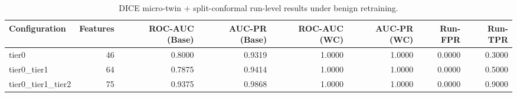 \begin{table}[t]
\centering
\caption{DICE micro-twin + split-conformal run-level results under benign retraining.}
\label{tab:dice_full_overall}
\footnotesize
\begin{tabular}{lrrrrrrr}
\toprule
Configuration & Features & ROC-AUC (Base) & AUC-PR (Base) & ROC-AUC (WC) & AUC-PR (WC) & Run-FPR & Run-TPR \\
\midrule
tier0 & 46 & 0.8000 & 0.9319 & 1.0000 & 1.0000 & 0.0000 & 0.3000 \\
tier0_tier1 & 64 & 0.7875 & 0.9414 & 1.0000 & 1.0000 & 0.0000 & 0.5000 \\
tier0_tier1_tier2 & 75 & 0.9375 & 0.9868 & 1.0000 & 1.0000 & 0.0000 & 0.9000 \\
\bottomrule
\end{tabular}

\end{table}
